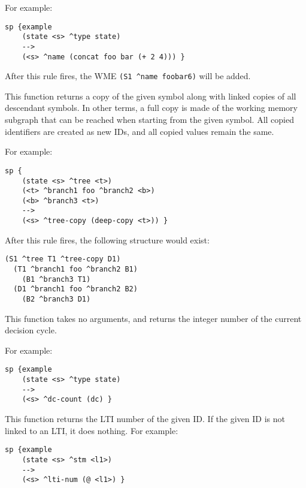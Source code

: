 \begin{description}
For example:

\begin{verbatim}
sp {example
    (state <s> ^type state)
    -->
    (<s> ^name (concat foo bar (+ 2 4))) }
\end{verbatim}

       After this rule fires, the WME \verb=(S1 ^name foobar6)= will be added.


\item [\soarb{deep-copy} --- ] This function returns a copy of the given symbol
along with linked copies of all descendant symbols. In other terms, a full copy is made of
the working memory subgraph that can be reached when starting from the given symbol.
All copied identifiers are created as new IDs, and all copied values remain the same.

For example:

\begin{verbatim}
sp {
    (state <s> ^tree <t>)
    (<t> ^branch1 foo ^branch2 <b>)
    (<b> ^branch3 <t>)
    -->
    (<s> ^tree-copy (deep-copy <t>)) }
\end{verbatim}

After this rule fires, the following structure would exist:

\begin{verbatim}
(S1 ^tree T1 ^tree-copy D1)
  (T1 ^branch1 foo ^branch2 B1)
    (B1 ^branch3 T1)
  (D1 ^branch1 foo ^branch2 B2)
    (B2 ^branch3 D1)
\end{verbatim}


\item [\soarb{dc} --- ] This function takes no arguments, and returns
the integer number of the current decision cycle. 

For example:

\begin{verbatim}
sp {example
    (state <s> ^type state)
    -->
    (<s> ^dc-count (dc) }
\end{verbatim}


\item [\soarb{@ (get)} --- ] This function returns the LTI number of the
given ID. If the given ID is not linked to an LTI, it does nothing.
For example:

\begin{verbatim}
sp {example
    (state <s> ^stm <l1>)
    -->
    (<s> ^lti-num (@ <l1>) }
\end{verbatim}


\end{description}
